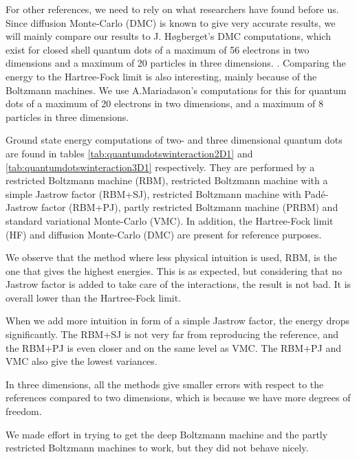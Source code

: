 For other references, we need to rely on what researchers have found before us. Since diffusion Monte-Carlo (DMC) is known to give very accurate results, we will mainly compare our results to J. Høgberget's DMC computations, which exist for closed shell quantum dots of a maximum of 56 electrons in two dimensions and a maximum of 20 particles in three dimensions. \cite{hogberget_quantum_2013}. Comparing the energy to the Hartree-Fock limit is also interesting, mainly because of the Boltzmann machines. We use A.Mariadason's computations for this for quantum dots of a maximum of 20 electrons in two dimensions, and a maximum of 8 particles in three dimensions. \cite{mariadason_quantum_2018}

Ground state energy computations of two- and three dimensional quantum dots are found in tables \eqref{tab:quantumdotswinteraction2D1} and \eqref{tab:quantumdotswinteraction3D1} respectively. They are performed by a restricted Boltzmann machine (RBM), restricted Boltzmann machine with a simple Jastrow factor (RBM+SJ), restricted Boltzmann machine with Padé-Jastrow factor (RBM+PJ), partly restricted Boltzmann machine (PRBM) and standard variational Monte-Carlo (VMC). In addition, the Hartree-Fock limit (HF) and diffusion Monte-Carlo (DMC) are present for reference purposes. 

We observe that the method where less physical intuition is used, RBM, is the one that gives the highest energies. This is as expected, but considering that no Jastrow factor is added to take care of the interactions, the result is not bad. It is overall lower than the Hartree-Fock limit. 

When we add more intuition in form of a simple Jastrow factor, the energy drops significantly. The RBM+SJ is not very far from reproducing the reference, and the RBM+PJ is even closer and on the same level as VMC. The RBM+PJ and VMC also give the lowest variances.

In three dimensions, all the methods give smaller errors with respect to the references compared to two dimensions, which is because we have more degrees of freedom.

We made effort in trying to get the deep Boltzmann machine and the partly restricted Boltzmann machines to work, but they did not behave nicely. 

